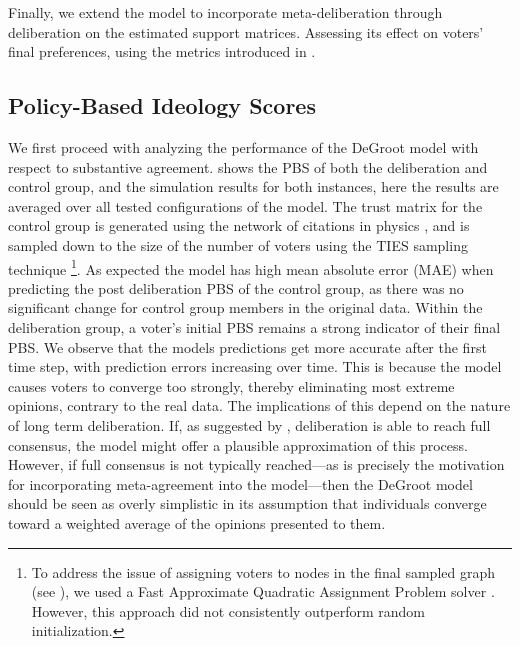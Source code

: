 Finally, we extend the model to incorporate meta-deliberation through deliberation
on the estimated support matrices. Assessing its effect on voters’ final preferences, using
the metrics introduced in .

\subsection{Policy-Based Ideology Scores}

We first proceed with analyzing the performance of the DeGroot model with
respect to substantive agreement.  shows the PBS of both the
deliberation and control group, and the simulation results for both instances,
here the results are averaged over all tested configurations of the model. The
trust matrix for the control group is generated using the network of citations
in physics \cite{nr}, and is sampled down to the size of the number of voters
using the TIES sampling technique
\cite{ahmedNetworkSamplingStatic2013}\footnote{To address the issue of
	assigning voters to nodes in the final sampled graph (see
	), we used a Fast Approximate Quadratic Assignment Problem
	solver \cite{vogelsteinFastApproximateQuadratic2015}. However, this
	approach did not consistently outperform random initialization.}. As expected
the model has high mean absolute error (MAE) when predicting the post
deliberation PBS of the control group, as there was no significant change for
control group members in the original data. Within the deliberation group, a
voter's initial PBS remains a strong indicator of their final PBS. We observe
that the models predictions get more accurate after the first time step, with
prediction errors increasing over time. This is because the model causes voters
to converge too strongly, thereby eliminating most extreme opinions, contrary
to the real data. The implications of this depend on the nature of long term
deliberation. If, as suggested by \citet{elsterMarketForumThree2002},
deliberation is able to reach full consensus, the model might offer a plausible
approximation of this process. However, if full consensus is not typically
reached—as is precisely the motivation for incorporating meta-agreement into
the model—then the DeGroot model should be seen as overly simplistic in its
assumption that individuals converge toward a weighted average of the opinions
presented to them.

